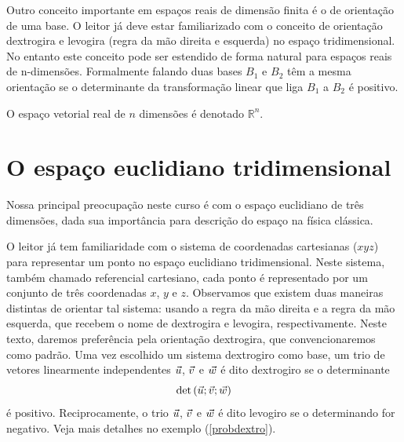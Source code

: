 Outro conceito importante em espaços reais de dimensão finita é o de orientação de uma base. O leitor já deve estar familiarizado com o conceito de orientação dextrogira e levogira (regra da mão direita e esquerda) no espaço tridimensional. No entanto este conceito pode ser estendido de forma natural para espaços reais de n-dimensões. Formalmente falando duas bases $B_1$ e $B_2$ têm a mesma orientação se o determinante da transformação linear que liga $B_1$ a $B_2$ é positivo.    

O espaço vetorial real de $n$ dimensões é denotado $\mathbb{R}^n$. 

\section{O espaço euclidiano tridimensional}
Nossa principal preocupação neste curso é com o espaço euclidiano de três dimensões, dada sua importância para descrição do espaço na física clássica.  
 
O leitor já tem familiaridade com o sistema de coordenadas cartesianas ($xyz$) para representar um ponto no espaço euclidiano tridimensional. Neste sistema, também chamado referencial cartesiano, cada ponto é representado por um conjunto de três coordenadas $x$, $y$ e $z$. Observamos que existem duas maneiras distintas de orientar tal sistema: usando a regra da mão direita e a regra da mão esquerda, que recebem o nome de dextrogira e levogira, respectivamente. Neste texto, daremos preferência pela orientação dextrogira, que convencionaremos como padrão. Uma vez escolhido um sistema dextrogiro como base,  um trio de vetores linearmente independentes $\vec{u}$, $\vec{v}$ e  $\vec{w}$ é dito dextrogiro se o determinante 
\begin{equation}\label{defdextro}
\det\left(\vec{u};\vec{v};\vec{w}\right)
\end{equation}   
é positivo. Reciprocamente, o trio  $\vec{u}$, $\vec{v}$ e  $\vec{w}$ é dito levogiro se o determinando for negativo. Veja mais detalhes no exemplo (\ref{probdextro}).

